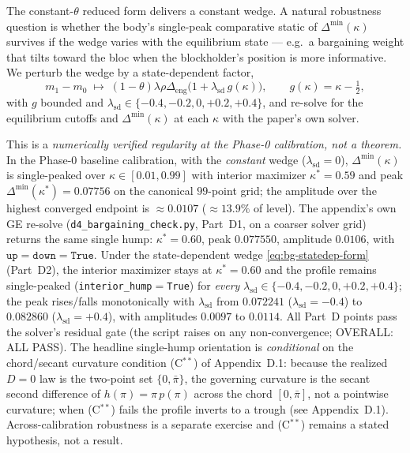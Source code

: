 The constant-$\theta$ reduced form delivers a constant wedge. A natural robustness
question is whether the body's single-peak comparative static of
$\Delta^{\min}(\kappa)$ survives if the wedge varies with the equilibrium state
--- e.g.\ a bargaining weight that tilts toward the bloc when the blockholder's
position is more informative. We perturb the wedge by a state-dependent factor,
\begin{equation}
  \label{eq:bg-statedep-form}
  m_{1}-m_{0}\;\mapsto\;(1-\theta)\lambda\rho\Delta_{\mathrm{eng}}\bigl(1+\lambda_{\mathrm{sd}}\,g(\kappa)\bigr),
  \qquad g(\kappa)=\kappa-\tfrac12,
\end{equation}
with $g$ bounded and $\lambda_{\mathrm{sd}}\in\{-0.4,-0.2,0,+0.2,+0.4\}$, and
re-solve for the equilibrium cutoffs and $\Delta^{\min}(\kappa)$ at each $\kappa$
with the paper's own solver.

\begin{numreg}
\label{nr:bg-statedep}
This is a \emph{numerically verified regularity at the Phase-0 calibration, not a
theorem.} In the Phase-0 baseline calibration, with the \emph{constant} wedge
($\lambda_{\mathrm{sd}}=0$), $\Delta^{\min}(\kappa)$ is single-peaked over
$\kappa\in[0.01,0.99]$ with interior maximizer $\kappa^{\ast}=0.59$ and peak
$\Delta^{\min}(\kappa^{\ast})=0.07756$ on the canonical $99$-point grid; the
amplitude over the highest converged endpoint is $\approx0.0107$ ($\approx13.9\%$
of level). The appendix's own GE re-solve (\texttt{d4\_bargaining\_check.py},
Part~D1, on a coarser solver grid) returns the same single hump:
$\kappa^{\ast}=0.60$, peak $0.077550$, amplitude $0.0106$, with
$\texttt{up}=\texttt{down}=\texttt{True}$. Under the state-dependent wedge
\eqref{eq:bg-statedep-form} (Part~D2), the interior maximizer stays at
$\kappa^{\ast}=0.60$ and the profile remains single-peaked
(\texttt{interior\_hump}$=$\texttt{True}) for \emph{every}
$\lambda_{\mathrm{sd}}\in\{-0.4,-0.2,0,+0.2,+0.4\}$; the peak rises/falls
monotonically with $\lambda_{\mathrm{sd}}$ from $0.072241$
($\lambda_{\mathrm{sd}}=-0.4$) to $0.082860$ ($\lambda_{\mathrm{sd}}=+0.4$), with
amplitudes $0.0097$ to $0.0114$. All Part~D points pass the solver's residual
gate (the script raises on any non-convergence; OVERALL: ALL PASS). The headline
single-hump orientation is \emph{conditional} on the chord/secant curvature
condition (C$^{\ast\ast}$) of Appendix~D.1: because the realized $D=0$ law is the
two-point set $\{0,\bar\pi\}$, the governing curvature is the secant second
difference of $h(\pi)=\pi\,p(\pi)$ across the chord $[0,\bar\pi]$, not a pointwise
curvature; when (C$^{\ast\ast}$) fails the profile inverts to a trough (see
Appendix~D.1). Across-calibration robustness is a separate exercise and
(C$^{\ast\ast}$) remains a stated hypothesis, not a result.
\end{numreg}

